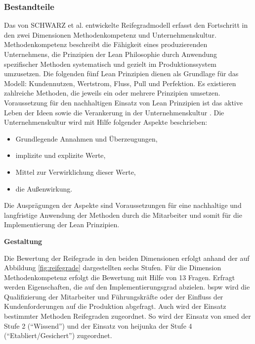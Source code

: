 \subsubsection{Bestandteile}
Das von SCHWARZ et al. entwickelte Reifegradmodell erfasst den Fortschritt in den zwei Dimensionen Methodenkompetenz und Unternehmenskultur. 
Methodenkompetenz beschreibt die Fähigkeit eines produzierenden Unternehmens, die Prinzipien der Lean Philosophie durch Anwendung spezifischer Methoden systematisch und gezielt im Produktionssystem umzusetzen. 
Die folgenden fünf Lean Prinzipien dienen als Grundlage für das Modell: Kundennutzen, Wertstrom, Fluss, Pull und Perfektion. 
Es existieren zahlreiche Methoden, die jeweils ein oder mehrere Prinzipien umsetzen. 
%
Voraussetzung für den nachhaltigen Einsatz von Lean Prinzipien ist das aktive Leben der Ideen sowie die Verankerung in der Unternehmenskultur \autocite{Baumgaertner2006}. 
% 
Die Unternehmenskultur wird mit Hilfe folgender Aspekte beschrieben: 
\begin{itemize}
\item Grundlegende Annahmen und Überzeugungen,
\item implizite und explizite Werte, 
\item Mittel zur Verwirklichung dieser Werte,
\item die Außenwirkung.
\end{itemize}
Die Ausprägungen der Aspekte sind Voraussetzungen für eine nachhaltige und langfristige Anwendung der Methoden durch die Mitarbeiter und somit für die Implementierung der Lean Prinzipien. 

\textbf{Gestaltung}

Die Bewertung der Reifegrade in den beiden Dimensionen erfolgt anhand der auf Abbildung \ref{fig:reifegrade} dargestellten sechs Stufen. 
%
Für die Dimension Methodenkompetenz erfolgt die Bewertung mit Hilfe von 13 Fragen. Erfragt werden Eigenschaften, die auf den Implementierungsgrad abzielen. \Gls{bspw} wird die Qualifizierung der Mitarbeiter und Führungskräfte oder der Einfluss der Kundenforderungen auf die Produktion abgefragt. 
Auch wird der Einsatz bestimmter Methoden Reifegraden zugeordnet. So wird der Einsatz von \gls{smed} der Stufe 2 (``Wissend'') und der Einsatz von \gls{heijunka} der Stufe 4 (``Etabliert/Gesichert'') zugeordnet. 

